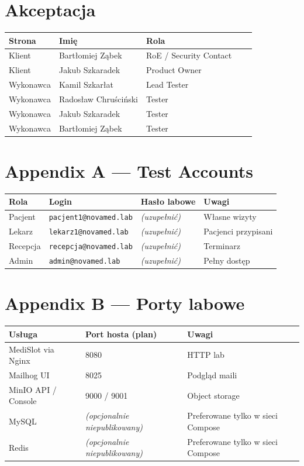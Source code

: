 \documentclass[11pt,a4paper]{article}
\begin{document}
\section{Akceptacja}

\begin{tabularx}{\textwidth}{@{}l l L c c@{}}
\toprule
\textbf{Strona} & \textbf{Imię} & \textbf{Rola} \\
\midrule
Klient & Bartłomiej Ząbek & RoE / Security Contact \\
Klient & Jakub Szkaradek & Product Owner & \\
Wykonawca & Kamil Szkarłat & Lead Tester & \\
Wykonawca & Radosław Chruściński & Tester & \\
Wykonawca & Jakub Szkaradek & Tester & \\
Wykonawca & Bartłomiej Ząbek & Tester & \\
\bottomrule
\end{tabularx}

\section*{Appendix A — Test Accounts}

\begin{tabularx}{\textwidth}{@{}l l l L@{}}
\toprule
\textbf{Rola} & \textbf{Login} & \textbf{Hasło labowe} & \textbf{Uwagi} \\
\midrule
Pacjent & \texttt{pacjent1@novamed.lab} & \emph{(uzupełnić)} & Własne wizyty \\
Lekarz & \texttt{lekarz1@novamed.lab} & \emph{(uzupełnić)} & Pacjenci przypisani \\
Recepcja & \texttt{recepcja@novamed.lab} & \emph{(uzupełnić)} & Terminarz \\
Admin & \texttt{admin@novamed.lab} & \emph{(uzupełnić)} & Pełny dostęp \\
\bottomrule
\end{tabularx}

\section*{Appendix B — Porty labowe}

\begin{tabularx}{\textwidth}{@{}l l L@{}}
\toprule
\textbf{Usługa} & \textbf{Port hosta (plan)} & \textbf{Uwagi} \\
\midrule
MediSlot via Nginx & 8080 & HTTP lab \\
Mailhog UI & 8025 & Podgląd maili \\
MinIO API / Console & 9000 / 9001 & Object storage \\
MySQL & \emph{(opcjonalnie niepublikowany)} & Preferowane tylko w sieci Compose \\
Redis & \emph{(opcjonalnie niepublikowany)} & Preferowane tylko w sieci Compose \\
\bottomrule
\end{tabularx}
\end{document}
